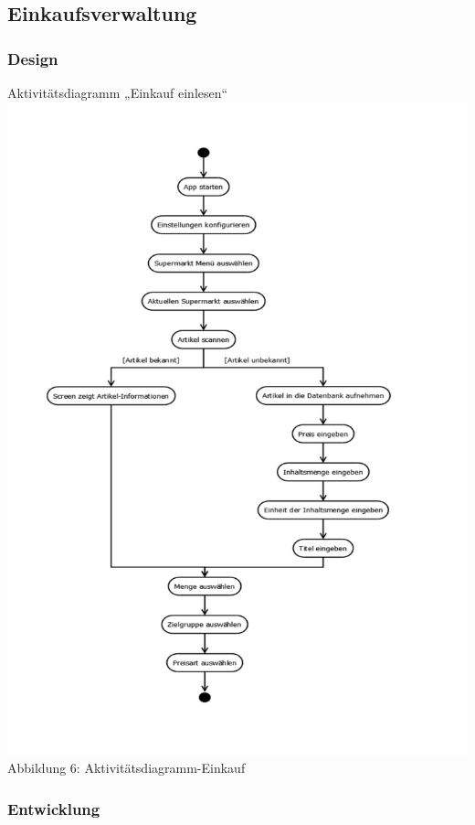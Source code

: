 \documentclass[12pt,a4paper]{article}
\begin{document}
\subsection{Einkaufsverwaltung}
\subsubsection*{Design}
Aktivitätsdiagramm „Einkauf einlesen“ 
\\
\hspace*{-10mm} 
\includegraphics[trim = 17mm 0mm 0mm 20mm,clip, scale=0.7]{Aktiv-Einkauf.pdf}
\\
\footnotesize Abbildung 6: Aktivitätsdiagramm-Einkauf
\normalsize
\subsubsection*{Entwicklung}
\newpage
\end{document}
